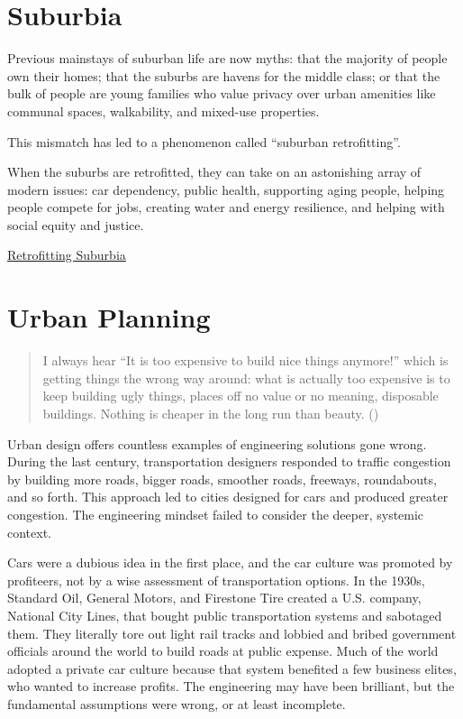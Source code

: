 \documentclass[
]{book}
\begin{document}
\hypertarget{suburbia}{%
\chapter{Suburbia}\label{suburbia}}

Previous mainstays of suburban life are now myths: that the majority of people own their homes; that the suburbs are havens for the middle class; or that the bulk of people are young families who value privacy over urban amenities like communal spaces, walkability, and mixed-use properties.

This mismatch has led to a phenomenon called ``suburban retrofitting''.

When the suburbs are retrofitted, they can take on an astonishing array of modern issues:
car dependency, public health, supporting aging people, helping people compete for jobs,
creating water and energy resilience, and helping with social equity and justice.

\href{https://www.vice.com/en/article/y3gx5b/the-people-the-suburbs-were-built-for-are-gone}{Retrofitting Suburbia}

\hypertarget{urban-planning}{%
\chapter{Urban Planning}\label{urban-planning}}

\begin{quote}
I always hear ``It is too expensive to build nice things anymore!'' which is getting things the wrong way around: what is actually too expensive is to keep building ugly things, places off no value or no meaning, disposable buildings. Nothing is cheaper in the long run than beauty. (\citet{wrathofgnon})
\end{quote}

Urban design offers countless examples of engineering solutions gone wrong. During the last century, transportation designers responded to traffic congestion by building more roads, bigger roads, smoother roads, freeways, roundabouts, and so forth. This approach led to cities designed for cars and produced greater congestion. The engineering mindset failed to consider the deeper, systemic context.

Cars were a dubious idea in the first place, and the car culture was promoted by profiteers, not by a wise assessment of transportation options. In the 1930s, Standard Oil, General Motors, and Firestone Tire created a U.S. company, National City Lines, that bought public transportation systems and sabotaged them. They literally tore out light rail tracks and lobbied and bribed government officials around the world to build roads at public expense. Much of the world adopted a private car culture because that system benefited a few business elites, who wanted to increase profits. The engineering may have been brilliant, but the fundamental assumptions were wrong, or at least incomplete.
\end{document}
